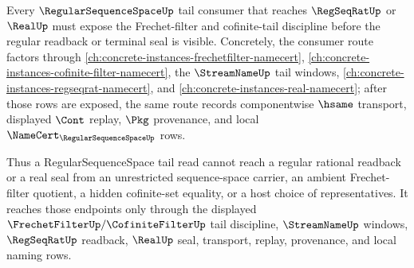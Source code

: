 \begin{theorem}\label{thm:regular-sequence-space-tail-filter-consumer}
Every $\RegularSequenceSpaceUp$ tail consumer that reaches $\RegSeqRatUp$ or $\RealUp$ must expose the Frechet-filter and cofinite-tail discipline before the regular readback or terminal seal is visible. Concretely, the consumer route factors through \autoref{ch:concrete-instances-frechetfilter-namecert}, \autoref{ch:concrete-instances-cofinite-filter-namecert}, the $\StreamNameUp$ tail windows, \autoref{ch:concrete-instances-regseqrat-namecert}, and \autoref{ch:concrete-instances-real-namecert}; after those rows are exposed, the same route records componentwise $\hsame$ transport, displayed $\Cont$ replay, $\Pkg$ provenance, and local $\NameCert_{\RegularSequenceSpaceUp}$ rows.

Thus a RegularSequenceSpace tail read cannot reach a regular rational readback or a real seal from an unrestricted sequence-space carrier, an ambient Frechet-filter quotient, a hidden cofinite-set equality, or a host choice of representatives. It reaches those endpoints only through the displayed $\FrechetFilterUp/\CofiniteFilterUp$ tail discipline, $\StreamNameUp$ windows, $\RegSeqRatUp$ readback, $\RealUp$ seal, transport, replay, provenance, and local naming rows.
\end{theorem}
